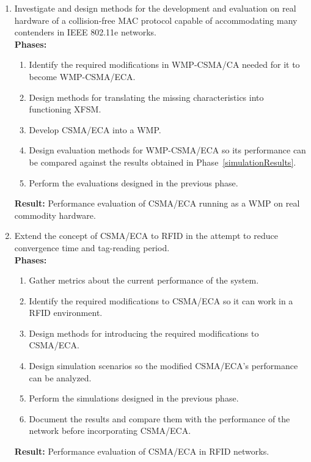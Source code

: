 \begin{enumerate}
	\item Investigate and design methods for the development and evaluation on real hardware of a collision-free MAC protocol capable of accommodating many contenders in IEEE 802.11e networks. \label{ECAinWMP}\\
	
	
	{\bfseries Phases:}
	\begin{enumerate}
		\item Identify the required modifications in WMP-CSMA/CA needed for it to become WMP-CSMA/ECA.\label{WMPModifications}
		\item Design methods for translating the missing characteristics into functioning XFSM.\label{accessByteCode}
		\item Develop CSMA/ECA into a WMP.
		\item Design evaluation methods for WMP-CSMA/ECA so its performance can be compared against the results obtained in Phase~\ref{simulationResults}.
		\item Perform the evaluations designed in the previous phase.\\
	\end{enumerate}
	{\bfseries Result:} Performance evaluation of CSMA/ECA running as a WMP on real commodity hardware.\\

	\item Extend the concept of CSMA/ECA to RFID in the attempt to reduce convergence time and tag-reading period.\label{ECAinRFID}\\
	
	{\bfseries Phases:}
	\begin{enumerate}
		\item Gather metrics about the current performance of the system.
		\item Identify the required modifications to CSMA/ECA so it can work in a RFID environment.
		\item Design methods for introducing the required modifications to CSMA/ECA.
		\item Design simulation scenarios so the modified CSMA/ECA's performance can be analyzed.
		\item Perform the simulations designed in the previous phase.
		\item Document the results and compare them with the performance of the network before incorporating CSMA/ECA.\\
	\end{enumerate}
	{\bfseries Result:} Performance evaluation of CSMA/ECA in RFID networks.\\

\end{enumerate}

